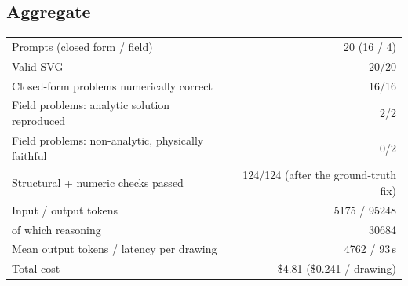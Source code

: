 \documentclass[11pt,a4paper]{article}
\begin{document}
\subsection{Aggregate}
\begin{center}
\begin{tabular}{lr}
\toprule
Prompts (closed form / field) & 20 (16 / 4) \\
Valid SVG & 20/20 \\
Closed-form problems numerically correct & 16/16 \\
Field problems: analytic solution reproduced & 2/2 \\
Field problems: non-analytic, physically faithful & 0/2 \\
Structural + numeric checks passed & 124/124 (after the ground-truth fix) \\
Input / output tokens & 5175 / 95248 \\
\quad of which reasoning & 30684 \\
Mean output tokens / latency per drawing & 4762 / 93\,s \\
Total cost & \$4.81 \quad (\$0.241 / drawing) \\
\bottomrule
\end{tabular}
\end{center}
\end{document}

